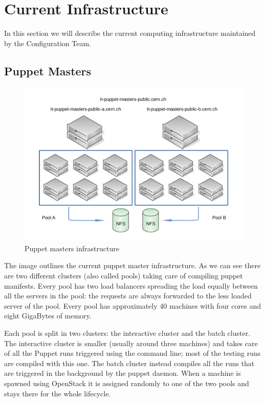 \section{Current Infrastructure}

In this section we will describe the current computing infrastructure
maintained by the Configuration Team.

\subsection{Puppet Masters}


\begin{figure}[H]
\includegraphics[width=\textwidth,height=\textheight,keepaspectratio]{ConfigurationManagement/Infrastructure_pm.jpg}
\caption{Puppet masters infrastructure}
\end{figure}

The image outlines the current puppet master infrastructure. As we can see
there are two different clusters (also called pools) taking care of
compiling puppet manifests. Every pool has two load balancers spreading
the load equally between all the servers in the pool: the requests are
always forwarded to the less loaded server of the pool. Every pool has
approximately 40 machines with four cores and eight GigaBytes of memory.

Each pool is split in two clusters: the interactive cluster and the batch
cluster. The interactive cluster is smaller (usually around three
machines) and takes care of all the Puppet runs triggered using the
command line; most of the testing runs are compiled with this one. The
batch cluster instead compiles all the runs that are triggered in the
background by the puppet daemon. When a machine is spawned using OpenStack
it is assigned randomly to one of the two pools and stays there for the
whole lifecycle.

